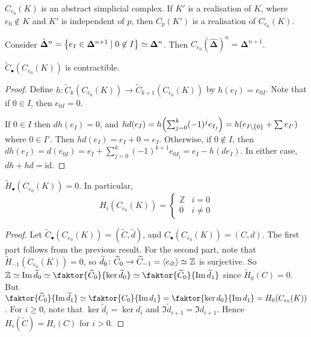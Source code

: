 \begin{remark}
	\( C_{e_0}(K) \) is an abstract simplicial complex.
	If \( K' \) is a realisation of \( K \), where \( e_0 \not\in K \) and \( K' \) is independent of \( p \), then \( C_p(K') \) is a realisation of \( C_{e_0}(K) \).
\end{remark}
\begin{example}
	Consider \( \hat{\bm \Delta} ^n= \qty{e_I \in \bm \Delta^{n+1} \mid 0 \not\in I} \simeq \bm\Delta^n \).
	Then \( C_{e_0}(\hat{\bm \Delta})^n = \bm \Delta^{n+1} \).
\end{example}
\begin{proposition}
	\( \widetilde C_\bullet(C_{e_0}(K)) \) is contractible.
\end{proposition}
\begin{proof}
	Define \( h \colon \widetilde C_k(C_{e_0}(K)) \to \widetilde C_{k+1}(C_{e_0}(K)) \) by \( h(e_I) = e_{0I} \).
	Note that if \( 0 \in I \), then \( e_{0I} = 0 \).

	If \( 0 \in I \) then \( dh(e_I) = 0 \), and \( hd(e_I) = h\qty(\sum_{j=0}^k (-1)^j e_{I_{\hat\jmath}}) = h(e_{I \setminus \qty{0}} + \sum e_{I'}) \) where \( 0 \in I' \).
	Then \( hd(e_I) = e_I + 0 = e_I \).
	Otherwise, if \( 0 \not\in I \), then \( dh(e_I) = d(e_{0I}) = e_I + \sum_{j=0}^k (-1)^{k+1} e_{0I_{\hat\jmath}} = e_I - h(de_I) \).
	In either case, \( dh + hd = \mathrm{id} \).
\end{proof}
\begin{corollary}
	\( \widetilde H_\bullet(C_{e_0}(K)) = 0 \).
	In particular,
	\[ H_i(C_{e_0}(K)) = \begin{cases}
		\mathbb Z & i = 0 \\
		0 & i \neq 0
	\end{cases} \]
\end{corollary}
\begin{proof}
	Let \( \widetilde C_\bullet(C_{e_0}(K)) = (\widetilde C, \widetilde d) \), and \( C_\bullet(C_{e_0}(K)) = (C, d) \).
	The first part follows from the previous result.
	For the second part, note that \( \widetilde H_{-1}(C_{e_0}(K)) = 0 \), so \( \widetilde d_0 \colon \widetilde C_0 \to \widetilde C_{-1} = \left\langle{} e_\varnothing \right\rangle \simeq \mathbb Z \) is surjective.
	So \( \mathbb Z \simeq \Im \widetilde d_0 \simeq \faktor{\widetilde C_0}{\ker \widetilde d_0} \simeq \faktor{\widetilde C_0}{\Im \widetilde d_1} \) since \( \widetilde H_0(C) = 0 \).
	But \( \faktor{\widetilde C_0}{\Im \widetilde d_1} \simeq \faktor{C_0}{\Im d_1} = \faktor{\ker d_0}{\Im d_1} = H_0(C_{e_0}(K)) \).
	For \( i \geq 0 \), note that \( \ker \widetilde d_i = \ker d_i \) and \( \Im \widetilde d_{i+1} = \Im d_{i+1} \).
	Hence \( H_i(\widetilde C) = H_i(C) \) for \( i > 0 \).
\end{proof}
